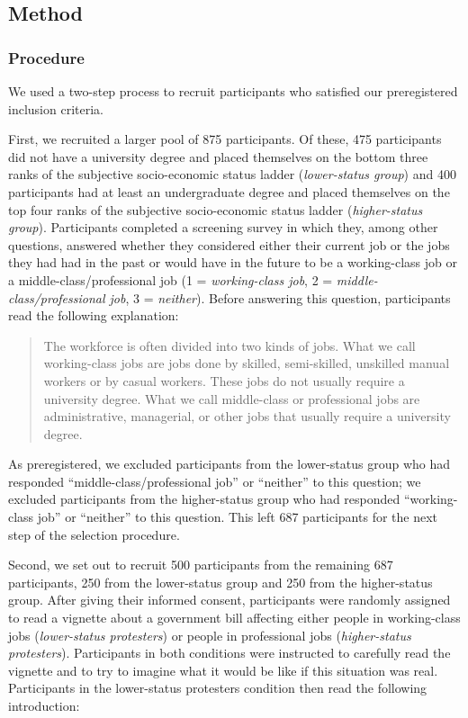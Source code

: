 \documentclass[12pt, letterpaper]{article}
\begin{document}
\hypertarget{method}{%
\subsection{Method}\label{method}}

\hypertarget{procedure}{%
\subsubsection{Procedure}\label{procedure}}

We used a two-step process to recruit participants who satisfied our
preregistered inclusion criteria.

First, we recruited a larger pool of 875 participants. Of these, 475
participants did not have a university degree and placed themselves on
the bottom three ranks of the subjective socio-economic status ladder
(\emph{lower-status group}) and 400 participants had at least an
undergraduate degree and placed themselves on the top four ranks of the
subjective socio-economic status ladder (\emph{higher-status group}).
Participants completed a screening survey in which they, among other
questions, answered whether they considered either their current job or
the jobs they had had in the past or would have in the future to be a
working-class job or a middle-class/professional job (1 =
\emph{working-class job}, 2 = \emph{middle-class/professional job}, 3 =
\emph{neither}). Before answering this question, participants read the
following explanation:

\begin{quote}
The workforce is often divided into two kinds of jobs. What we call
working-class jobs are jobs done by skilled, semi-skilled, unskilled
manual workers or by casual workers. These jobs do not usually require a
university degree. What we call middle-class or professional jobs are
administrative, managerial, or other jobs that usually require a
university degree.
\end{quote}

\noindent As preregistered, we excluded participants from the
lower-status group who had responded ``middle-class/professional job''
or ``neither'' to this question; we excluded participants from the
higher-status group who had responded ``working-class job'' or
``neither'' to this question. This left 687 participants for the next
step of the selection procedure.

Second, we set out to recruit 500 participants from the remaining 687
participants, 250 from the lower-status group and 250 from the
higher-status group. After giving their informed consent, participants
were randomly assigned to read a vignette about a government bill
affecting either people in working-class jobs (\emph{lower-status
protesters}) or people in professional jobs (\emph{higher-status
protesters}). Participants in both conditions were instructed to
carefully read the vignette and to try to imagine what it would be like
if this situation was real. Participants in the lower-status protesters
condition then read the following introduction:
\end{document}
